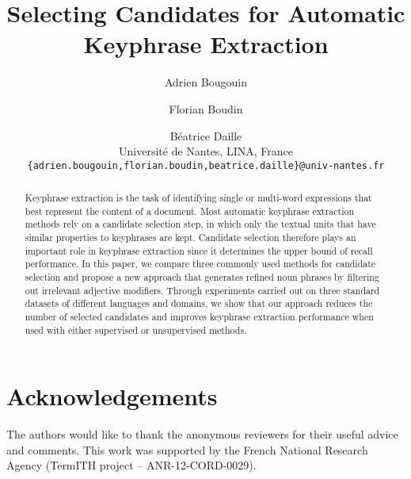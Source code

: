 \documentclass[11pt]{article}
\title{Selecting Candidates for Automatic Keyphrase Extraction}
\author{
  Adrien Bougouin \and Florian Boudin \and Béatrice Daille\\
  Université de Nantes, LINA, France\\
  {\tt \{adrien.bougouin,florian.boudin,beatrice.daille\}@univ-nantes.fr}
}
\date{}
\begin{document}
  \maketitle
  \begin{abstract}
    Keyphrase extraction is the task of identifying single or multi-word
    expressions that best represent the content of a document. Most automatic
    keyphrase extraction methods rely on a candidate selection step, in which
    only the textual units that have similar properties to keyphrases are kept.
    Candidate selection therefore plays an important role in keyphrase
    extraction since it determines the upper bound of recall performance. In
    this paper, we compare three commonly used methods for candidate selection
    and propose a new approach that generates refined noun phrases by filtering
    out irrelevant adjective modifiers. Through experiments carried out on three
    standard datasets of different languages and domains, we show that our
    approach reduces the number of selected candidates and improves keyphrase
    extraction performance when used with either supervised or unsupervised
    methods.
  \end{abstract}

  

  \section*{Acknowledgements}
  The authors would like to thank the anonymous reviewers for their useful
  advice and comments. This work was supported by the French National Research
  Agency (TermITH project -- ANR-12-CORD-0029).

  
  
\end{document}
